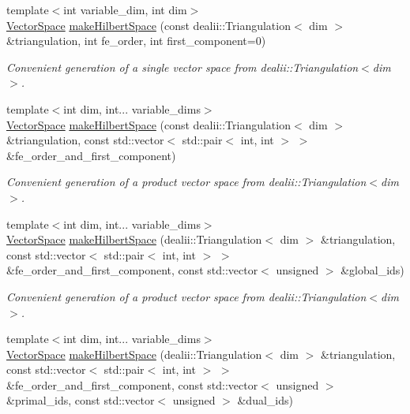 \begin{DoxyCompactItemize}
\item 
{\footnotesize template$<$int variable\-\_\-dim, int dim$>$ }\\\hyperlink{classSpacy_1_1VectorSpace}{Vector\-Space} \hyperlink{namespaceSpacy_1_1dealII_a97a92becc85fac6fbf3598ef8ff1ca9c}{make\-Hilbert\-Space} (const dealii\-::\-Triangulation$<$ dim $>$ \&triangulation, int fe\-\_\-order, int first\-\_\-component=0)
\begin{DoxyCompactList}\small\item\em Convenient generation of a single vector space from dealii\-::\-Triangulation$<$dim$>$. \end{DoxyCompactList}\item 
{\footnotesize template$<$int dim, int... variable\-\_\-dims$>$ }\\\hyperlink{classSpacy_1_1VectorSpace}{Vector\-Space} \hyperlink{namespaceSpacy_1_1dealII_a554fe46c7a1b93af7dae16a6628e517a}{make\-Hilbert\-Space} (const dealii\-::\-Triangulation$<$ dim $>$ \&triangulation, const std\-::vector$<$ std\-::pair$<$ int, int $>$ $>$ \&fe\-\_\-order\-\_\-and\-\_\-first\-\_\-component)
\begin{DoxyCompactList}\small\item\em Convenient generation of a product vector space from dealii\-::\-Triangulation$<$dim$>$. \end{DoxyCompactList}\item 
{\footnotesize template$<$int dim, int... variable\-\_\-dims$>$ }\\\hyperlink{classSpacy_1_1VectorSpace}{Vector\-Space} \hyperlink{namespaceSpacy_1_1dealII_ab50ddf339c5fdf179bb932ba63b0d4c7}{make\-Hilbert\-Space} (dealii\-::\-Triangulation$<$ dim $>$ \&triangulation, const std\-::vector$<$ std\-::pair$<$ int, int $>$ $>$ \&fe\-\_\-order\-\_\-and\-\_\-first\-\_\-component, const std\-::vector$<$ unsigned $>$ \&global\-\_\-ids)
\begin{DoxyCompactList}\small\item\em Convenient generation of a product vector space from dealii\-::\-Triangulation$<$dim$>$. \end{DoxyCompactList}\item 
{\footnotesize template$<$int dim, int... variable\-\_\-dims$>$ }\\\hyperlink{classSpacy_1_1VectorSpace}{Vector\-Space} \hyperlink{namespaceSpacy_1_1dealII_aa87aa4cc2ea668da33e0a353e9af8cbc}{make\-Hilbert\-Space} (dealii\-::\-Triangulation$<$ dim $>$ \&triangulation, const std\-::vector$<$ std\-::pair$<$ int, int $>$ $>$ \&fe\-\_\-order\-\_\-and\-\_\-first\-\_\-component, const std\-::vector$<$ unsigned $>$ \&primal\-\_\-ids, const std\-::vector$<$ unsigned $>$ \&dual\-\_\-ids)

\end{DoxyCompactItemize}
